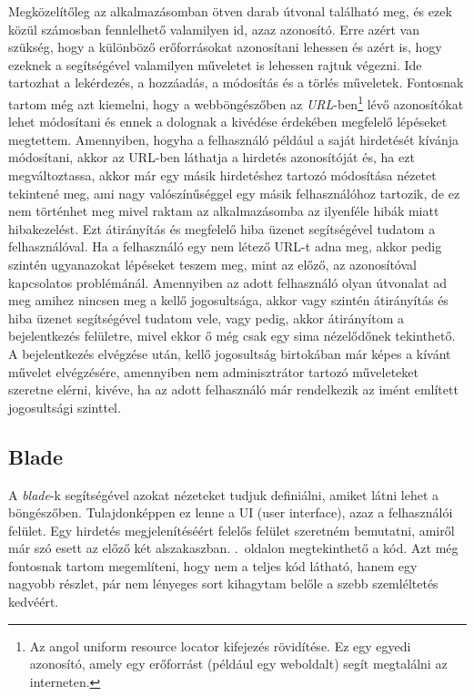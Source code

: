 \documentclass[]{thesis-ekf}
\theoremstyle{definition}
\theoremstyle{remark}
\begin{document}
		Megközelítőleg az alkalmazásomban ötven darab útvonal található meg, és ezek közül számosban fennlelhető valamilyen id, azaz azonosító. Erre azért van szükség, hogy a különböző erőforrásokat azonosítani lehessen és azért is, hogy ezeknek a segítségével valamilyen műveletet is lehessen rajtuk végezni. Ide tartozhat a lekérdezés, a hozzáadás, a módosítás és a törlés műveletek. Fontosnak tartom még azt kiemelni, hogy a webböngészőben az \emph{URL}-ben\footnote{Az angol uniform resource locator kifejezés rövidítése. Ez egy egyedi azonosító, amely egy erőforrást (például egy weboldalt) segít megtalálni az interneten.} lévő azonosítókat lehet módosítani és ennek a dolognak a kivédése érdekében megfelelő lépéseket megtettem. Amennyiben, hogyha a felhasználó például a saját hirdetését kívánja módosítani, akkor az URL-ben láthatja a hirdetés azonosítóját és, ha ezt megváltoztassa, akkor már egy másik hirdetéshez tartozó módosítása nézetet tekintené meg, ami nagy valószínűséggel egy másik felhasználóhoz tartozik, de ez nem történhet meg mivel raktam az alkalmazásomba az ilyenféle hibák miatt hibakezelést. Ezt átirányítás és megfelelő hiba üzenet segítségével tudatom a felhasználóval. Ha a felhasználó egy nem létező URL-t adna meg, akkor pedig szintén ugyanazokat lépéseket teszem meg, mint az előző, az azonosítóval kapcsolatos problémánál. Amennyiben az adott felhasználó olyan útvonalat ad meg amihez nincsen meg a kellő jogosultsága, akkor vagy szintén átirányítás és hiba üzenet segítségével tudatom vele, vagy pedig, akkor átirányítom a bejelentkezés felületre, mivel ekkor ő még csak egy sima nézelődőnek tekinthető. A bejelentkezés elvégzése után, kellő jogosultság birtokában már képes a kívánt művelet elvégzésére, amennyiben nem adminisztrátor tartozó műveleteket szeretne elérni, kivéve, ha az adott felhasználó már rendelkezik az imént említett jogosultsági szinttel.
	
	\subsection{Blade}\label{sc-blade}
		A \emph{blade}-k segítségével azokat nézeteket tudjuk definiálni, amiket látni lehet a böngészőben. Tulajdonképpen ez lenne a UI (user interface), azaz a felhasználói felület. Egy hirdetés megjelenítéséért felelős felület szeretném bemutatni, amiről már szó esett az előző két alszakaszban. \Az{\pageref{kod-blade}}.~oldalon megtekinthető a kód. Azt még fontosnak tartom megemlíteni, hogy nem a teljes kód látható, hanem egy nagyobb részlet, pár nem lényeges sort kihagytam belőle a szebb szemléltetés kedvéért.
	
\end{document}
